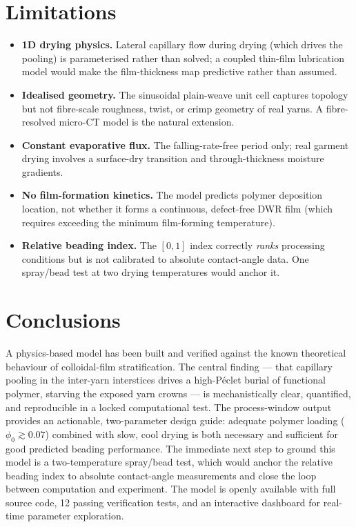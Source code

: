 \documentclass[11pt,a4paper]{article}
\begin{document}
\section{Limitations}

\begin{itemize}\setlength\itemsep{2pt}
  \item \textbf{1D drying physics.} Lateral capillary flow during drying
        (which drives the pooling) is parameterised rather than solved; a
        coupled thin-film lubrication model would make the film-thickness
        map predictive rather than assumed.
  \item \textbf{Idealised geometry.} The sinusoidal plain-weave unit cell
        captures topology but not fibre-scale roughness, twist, or crimp
        geometry of real yarns. A fibre-resolved micro-CT model is the
        natural extension.
  \item \textbf{Constant evaporative flux.} The falling-rate-free period
        only; real garment drying involves a surface-dry transition and
        through-thickness moisture gradients.
  \item \textbf{No film-formation kinetics.} The model predicts polymer
        deposition location, not whether it forms a continuous, defect-free
        DWR film (which requires exceeding the minimum film-forming
        temperature).
  \item \textbf{Relative beading index.} The $[0,1]$ index correctly
        \emph{ranks} processing conditions but is not calibrated to absolute
        contact-angle data. One spray/bead test at two drying temperatures
        would anchor it.
\end{itemize}

\section{Conclusions}

A physics-based model has been built and verified against the known
theoretical behaviour of colloidal-film stratification.
The central finding — that capillary pooling in the inter-yarn interstices
drives a high-P\'{e}clet burial of functional polymer, starving the exposed
yarn crowns — is mechanistically clear, quantified, and reproducible in a
locked computational test.
The process-window output provides an actionable, two-parameter design
guide: adequate polymer loading ($\phi_{0} \gtrsim 0.07$) combined with
slow, cool drying is both necessary and sufficient for good predicted
beading performance.
The immediate next step to ground this model is a two-temperature
spray/bead test, which would anchor the relative beading index to absolute
contact-angle measurements and close the loop between computation and
experiment.
The model is openly available with full source code, 12 passing
verification tests, and an interactive dashboard for real-time parameter
exploration.
\end{document}

